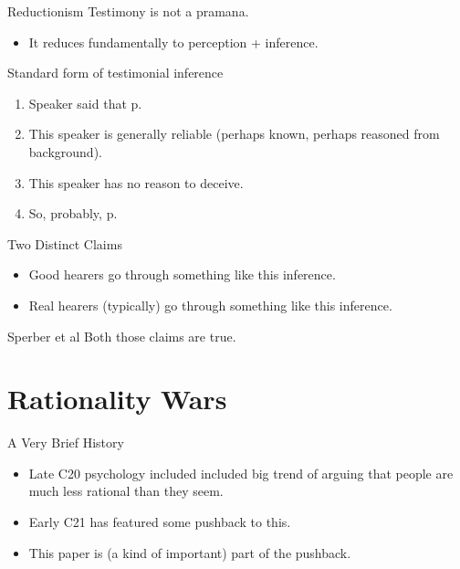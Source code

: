 \documentclass[
  17pt,
  letterpaper,
  ignorenonframetext,
  aspectratio=169,
  handout]{beamer}
\providecommand{\tightlist}{%
  \setlength{\itemsep}{0pt}\setlength{\parskip}{0pt}}\usepackage{longtable,booktabs,array}
\begin{document}
\begin{frame}{Reductionism}
\protect\hypertarget{reductionism-1}{}
Testimony is not a pramana.

\begin{itemize}[<+->]
\tightlist
\item
  It reduces fundamentally to perception + inference.
\end{itemize}
\end{frame}

\begin{frame}{Standard form of testimonial inference}
\protect\hypertarget{standard-form-of-testimonial-inference}{}
\begin{enumerate}[<+->]
\tightlist
\item
  Speaker said that p.
\item
  This speaker is generally reliable (perhaps known, perhaps reasoned
  from background).
\item
  This speaker has no reason to deceive.
\item
  So, probably, p.
\end{enumerate}
\end{frame}

\begin{frame}{Two Distinct Claims}
\protect\hypertarget{two-distinct-claims}{}
\begin{itemize}[<+->]
\tightlist
\item
  Good hearers go through something like this inference.
\item
  Real hearers (typically) go through something like this inference.
\end{itemize}
\end{frame}

\begin{frame}{Sperber et al}
\protect\hypertarget{sperber-et-al}{}
Both those claims are true.
\end{frame}

\hypertarget{rationality-wars}{%
\section{Rationality Wars}\label{rationality-wars}}

\begin{frame}{A Very Brief History}
\protect\hypertarget{a-very-brief-history}{}
\begin{itemize}[<+->]
\tightlist
\item
  Late C20 psychology included included big trend of arguing that people
  are much less rational than they seem.
\item
  Early C21 has featured some pushback to this.
\item
  This paper is (a kind of important) part of the pushback.
\end{itemize}
\end{frame}
\end{document}
